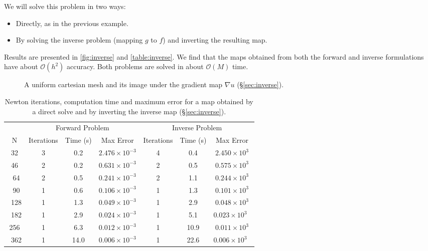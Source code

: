 \documentclass{amsart}
\theoremstyle{lemma}
\theoremstyle{remark}
\begin{document}
We will solve this problem in two ways:
\begin{itemize}
\item Directly, as in the previous example.
\item By solving the inverse problem (mapping $g$ to $f$) and inverting the resulting map.
\end{itemize}

Results are presented in \autoref{fig:inverse} and \autoref{table:inverse}.  We find that the maps obtained from both the forward and inverse formulations have about ${\mathcal{O}}(h^2)$ accuracy.  Both problems are solved in about ${\mathcal{O}}(M)$ time.

\begin{figure}[htdp]
	\centering
  	\vspace*{-12pt}\caption{
  	 A uniform cartesian mesh and  its image under the gradient map $\nabla 	u$ (\S\ref{sec:inverse}). }
  	\label{fig:inverse}
\end{figure} 

\begin{table}[htdp]\small
\begin{center}
\begin{tabular}{ccccccc}
 &  \multicolumn{3}{c}{Forward Problem} & \multicolumn{3}{c}{Inverse Problem} \\
N  &  Iterations & Time (s) & {Max Error} & Iterations & Time (s) & {Max Error}\\
\hline
32 & 3 & 0.2 & $2.476\times10^{-3}$ & 4 & 0.4 & $2.450\times10^3$\\
46 & 2 &  0.2 & $0.631\times10^{-3}$ & 2 & 0.5 & $0.575\times10^3$\\\
64 & 2& 0.5 &   $0.241\times10^{-3}$ & 2& 1.1 & $0.244\times10^3$\\\
90 &  1 & 0.6 & $0.106\times10^{-3}$ & 1& 1.3 & $0.101\times10^3$\\\
128 & 1 & 1.3 & $0.049\times10^{-3}$ & 1& 2.9 & $0.048\times10^3$\\\
182 & 1 & 2.9 & $0.024\times10^{-3}$ & 1 & 5.1 &$0.023\times10^3$\ \\
256 & 1 & 6.3 & $0.012\times10^{-3}$ & 1& 10.9 & $0.011\times10^3$\\\
362 &  1 & 14.0 & $0.006\times10^{-3}$ & 1 & 22.6 &$0.006\times10^3$\
\end{tabular}
\end{center}
\caption{Newton iterations, computation time and maximum error for a map obtained by a direct solve and by inverting the inverse map (\S\ref{sec:inverse}).}
\label{table:inverse}
\end{table}
\end{document}
